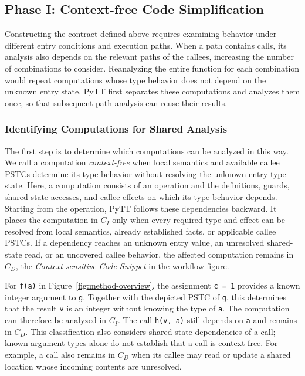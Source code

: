 \subsection{Phase I: Context-free Code Simplification}
\label{sec:extraction}

Constructing the contract defined above requires examining behavior under
different entry conditions and execution paths. When a path contains
calls, its analysis also depends on the relevant paths of the callees,
increasing the number of combinations to consider. Reanalyzing the entire
function for each combination would repeat computations whose type
behavior does not depend on the unknown entry state. PyTT first separates
these computations and analyzes them once, so that subsequent path
analysis can reuse their results.

\subsubsection{Identifying Computations for Shared Analysis}

The first step is to determine which computations can be analyzed in
this way. We call a computation \emph{context-free} when local semantics
and available callee PSTCs determine its type behavior without resolving
the unknown entry type-state. Here, a computation consists of an operation
and the definitions, guards, shared-state accesses, and callee effects on
which its type behavior depends. Starting from the operation, PyTT follows
these dependencies backward. It places the computation in $C_I$ only when
every required type and effect can be resolved from local semantics,
already established facts, or applicable callee PSTCs. If a dependency
reaches an unknown entry value, an unresolved shared-state read, or an
uncovered callee behavior, the affected computation remains in $C_D$, the
\emph{Context-sensitive Code Snippet} in the workflow figure.

For \texttt{f(a)} in Figure~\ref{fig:method-overview}, the assignment
\texttt{c = 1} provides a known integer argument to \texttt{g}. Together
with the depicted PSTC of \texttt{g}, this determines that the result
\texttt{v} is an integer without knowing the type of \texttt{a}. The
computation can therefore be analyzed in $C_I$. The call
\texttt{h(v, a)} still depends on \texttt{a} and remains in $C_D$.
This classification also considers shared-state dependencies of a call;
known argument types alone do not establish that a call is context-free.
For example, a call also remains in $C_D$ when its callee may read or
update a shared location whose incoming contents are unresolved.

